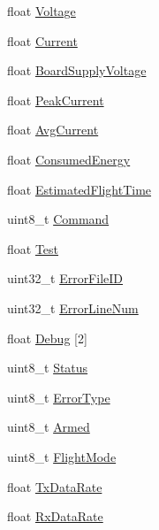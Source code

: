 \begin{DoxyCompactItemize}
\item 
float \hyperlink{struct____attribute_____a3640543e67ae2225c506d33f6875dd71}{\-Voltage}
\item 
float \hyperlink{struct____attribute_____ac2295ffc0a545d794279e67a87b2d527}{\-Current}
\item 
float \hyperlink{struct____attribute_____a1f3528a983ecc15aa2e897c31d350162}{\-Board\-Supply\-Voltage}
\item 
float \hyperlink{struct____attribute_____af93f69401c47708e512e553823b48aa4}{\-Peak\-Current}
\item 
float \hyperlink{struct____attribute_____a7a30d31dba74cf0d4f07b69b09a25090}{\-Avg\-Current}
\item 
float \hyperlink{struct____attribute_____a212f767739033ba6edacdf3e54096b20}{\-Consumed\-Energy}
\item 
float \hyperlink{struct____attribute_____aaa2fa904c29361ed509995c903914344}{\-Estimated\-Flight\-Time}
\item 
uint8\-\_\-t \hyperlink{struct____attribute_____ae0af8d68998463a6da984d8a7cc9c57f}{\-Command}
\item 
float \hyperlink{struct____attribute_____aca7172ae1a5e21256b33fe584ddfe075}{\-Test}
\item 
uint32\-\_\-t \hyperlink{struct____attribute_____a3143008071e810ddc27303e896a8abe7}{\-Error\-File\-I\-D}
\item 
uint32\-\_\-t \hyperlink{struct____attribute_____a3cd25b7227bd8045a334d6491d90c5ce}{\-Error\-Line\-Num}
\item 
float \hyperlink{struct____attribute_____a5492a5a76ef841156edca6107e59e937}{\-Debug} \mbox{[}2\mbox{]}
\item 
uint8\-\_\-t \hyperlink{struct____attribute_____a486ea1e9933b56f787ad2e87a96cc81c}{\-Status}
\item 
uint8\-\_\-t \hyperlink{struct____attribute_____ac3f37a8d7761a72ba40237aed33888c8}{\-Error\-Type}
\item 
uint8\-\_\-t \hyperlink{struct____attribute_____aceb2027e5cc4bcba87a4b4dae2c6ca47}{\-Armed}
\item 
uint8\-\_\-t \hyperlink{struct____attribute_____ae6cfb7812d5f74336f772ea545dff592}{\-Flight\-Mode}
\item 
float \hyperlink{struct____attribute_____ae65ec0b799fb39bcc0eb35bfcb38abb2}{\-Tx\-Data\-Rate}
\item 
float \hyperlink{struct____attribute_____ae41fedc88e82e2d7358b9642b9c4e8f1}{\-Rx\-Data\-Rate}
\item 

\end{DoxyCompactItemize}
